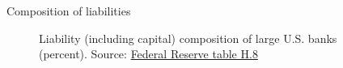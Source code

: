 \begin{frame}{Composition of liabilities}

\begin{figure}
\begin{center}


\caption{\label{fig:L4_Liability_composition_large_banks} Liability (including capital) composition of large U.S. banks (percent). Source: \href{https://www.federalreserve.gov/releases/h8/current/default.htm}{Federal Reserve table H.8}}

\end{center}
\end{figure}

\end{frame}



